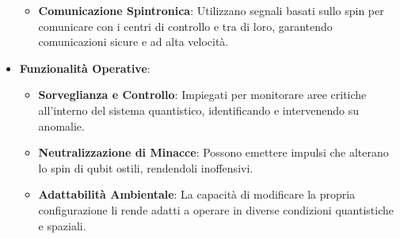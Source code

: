 \begin{tcolorbox}[fontupper=\tiny, fontlower=\Large,colback=white,colframe=black,title=\textbf{CH$_4$ Drones} (\emph{Droni Molecolari di Metano} pt.1)]
\begin{multicols}{2}
\begin{itemize}
\begin{itemize}
        \item \textbf{Comunicazione Spintronica}: Utilizzano segnali basati sullo spin per comunicare con i centri di controllo e tra di loro, garantendo comunicazioni sicure e ad alta velocità.
    \end{itemize}
    \item \textbf{Funzionalità Operative}:
    \begin{itemize}
        \item \textbf{Sorveglianza e Controllo}: Impiegati per monitorare aree critiche all'interno del sistema quantistico, identificando e intervenendo su anomalie.
        \item \textbf{Neutralizzazione di Minacce}: Possono emettere impulsi che alterano lo spin di qubit ostili, rendendoli inoffensivi.
        \item \textbf{Adattabilità Ambientale}: La capacità di modificare la propria configurazione li rende adatti a operare in diverse condizioni quantistiche e spaziali.
    \end{itemize}
\end{itemize}
\end{multicols}
\end{tcolorbox}

